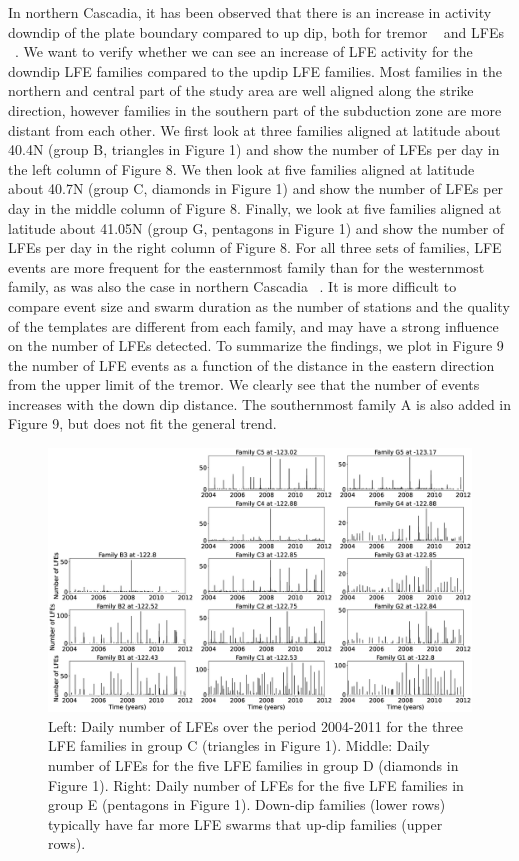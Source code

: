 \documentclass[draft]{agujournal2019}
\begin{document}
In northern Cascadia, it has been observed that there is an increase in activity downdip of the plate boundary compared to up dip, both for tremor ~\cite{WEC_2011} and LFEs ~\cite{SWE_2019}. We want to verify whether we can see an increase of LFE activity for the downdip LFE families compared to the updip LFE families. Most families in the northern and central part of the study area are well aligned along the strike direction, however families in the southern part of the subduction zone are more distant from each other. We first look at three families aligned at latitude about 40.4N (group B, triangles in Figure 1) and show the number of LFEs per day in the left column of Figure 8. We then look at five families aligned at latitude about 40.7N (group C, diamonds in Figure 1) and show the number of LFEs per day in the middle column of Figure 8. Finally, we look at five families aligned at latitude about 41.05N (group G, pentagons in Figure 1) and show the number of LFEs per day in the right column of Figure 8. For all three sets of families, LFE events are more frequent for the easternmost family than for the westernmost family, as was also the case in northern Cascadia ~\cite{SWE_2019}. It is more difficult to compare event size and swarm duration as the number of stations and the quality of the templates are different from each family, and may have a strong influence on the number of LFEs detected. To summarize the findings, we plot in Figure 9 the number of LFE events as a function of the distance in the eastern direction from the upper limit of the tremor. We clearly see that the number of events increases with the down dip distance. The southernmost family A is also added in Figure 9, but does not fit the general trend.\\

\begin{figure}
\noindent\includegraphics[width=\textwidth, trim={0cm 0cm 0cm 0cm},clip]{figures/set_daily_LFEs.eps}
\caption{Left: Daily number of LFEs over the period 2004-2011 for the three LFE families in group C (triangles in Figure 1). Middle: Daily number of LFEs for the five LFE families in group D (diamonds in Figure 1). Right: Daily number of LFEs for the five LFE families in group E (pentagons in Figure 1). Down-dip families (lower rows) typically have far more LFE swarms that up-dip families (upper rows).}
\label{pngfiguresample}
\end{figure}
\end{document}
